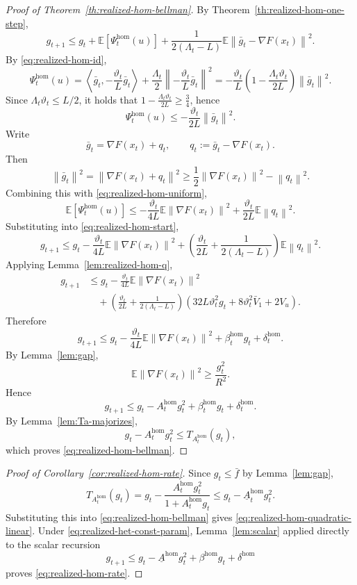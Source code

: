\documentclass{article}
\theoremstyle{definition}
\newcommand{\EE}{\mathbb E}
\newcommand{\norm}[1]{\left\lVert #1\right\rVert}
\newcommand{\ip}[2]{\left\langle #1,#2\right\rangle}
\begin{document}
\begin{proof}[Proof of Theorem~\ref{th:realized-hom-bellman}]
By Theorem~\ref{th:realized-hom-one-step},
\begin{equation}
g_{t+1}
\le
g_t+\EE[\Psi_t^{\mathrm{hom}}(u)]
+
\frac{1}{2(\Lambda_t-L)}\EE\norm{\bar g_t-\nabla F(x_t)}^2.
\label{eq:realized-hom-start}\end{equation}
By \eqref{eq:realized-hom-id},
\[
\Psi_t^{\mathrm{hom}}(u)
=
\ip{\bar g_t}{-\frac{\vartheta_t}{L}\bar g_t}
+
\frac{\Lambda_t}{2}
\left\|-\frac{\vartheta_t}{L}\bar g_t\right\|^2
=
-\frac{\vartheta_t}{L}
\left(
1-\frac{\Lambda_t\vartheta_t}{2L}
\right)\norm{\bar g_t}^2.
\]
Since $\Lambda_t\vartheta_t\le L/2$, it holds that $1-\frac{\Lambda_t\vartheta_t}{2L}\ge \frac34$,
hence
\begin{equation}
\Psi_t^{\mathrm{hom}}(u)\le -\frac{\vartheta_t}{2L}\norm{\bar g_t}^2.
\label{eq:realized-hom-uniform}\end{equation}
Write
\[
\bar g_t=\nabla F(x_t)+q_t,
\qquad
q_t:=\bar g_t-\nabla F(x_t).
\]
Then
\[
\norm{\bar g_t}^2
=
\norm{\nabla F(x_t)+q_t}^2
\ge
\frac12\norm{\nabla F(x_t)}^2-\norm{q_t}^2.
\]
Combining this with \eqref{eq:realized-hom-uniform},
\[
\EE[\Psi_t^{\mathrm{hom}}(u)]
\le
-\frac{\vartheta_t}{4L}\EE\norm{\nabla F(x_t)}^2
+
\frac{\vartheta_t}{2L}\EE\norm{q_t}^2.
\]
Substituting into \eqref{eq:realized-hom-start},
\[
g_{t+1}
\le
g_t
-
\frac{\vartheta_t}{4L}\EE\norm{\nabla F(x_t)}^2
+
\left(
\frac{\vartheta_t}{2L}
+
\frac{1}{2(\Lambda_t-L)}
\right)\EE\norm{q_t}^2.
\]
Applying Lemma~\ref{lem:realized-hom-q},
\begin{align*}
g_{t+1}
&\le
g_t
-
\frac{\vartheta_t}{4L}\EE\norm{\nabla F(x_t)}^2\\
&\quad+
\left(
\frac{\vartheta_t}{2L}
+
\frac{1}{2(\Lambda_t-L)}
\right)
\left(
32L\vartheta_t^2 g_t
+
8\vartheta_t^2\bar V_1
+
2V_u
\right).
\end{align*}
Therefore
\[
g_{t+1}
\le
g_t
-
\frac{\vartheta_t}{4L}\EE\norm{\nabla F(x_t)}^2
+
\beta_t^{\mathrm{hom}}g_t
+
\delta_t^{\mathrm{hom}}.
\]
By Lemma~\ref{lem:gap},
\[
\EE\norm{\nabla F(x_t)}^2\ge \frac{g_t^2}{R^2}.
\]
Hence
\[
g_{t+1}
\le
g_t-A_t^{\mathrm{hom}}g_t^2+\beta_t^{\mathrm{hom}}g_t+\delta_t^{\mathrm{hom}}.
\]
By Lemma~\ref{lem:Ta-majorizes},
\[
g_t-A_t^{\mathrm{hom}}g_t^2\le T_{A_t^{\mathrm{hom}}}(g_t),
\]
which proves \eqref{eq:realized-hom-bellman}.
\end{proof}

\begin{proof}[Proof of Corollary~\ref{cor:realized-hom-rate}]
Since $g_t\le \bar f$ by Lemma~\ref{lem:gap},
\[
T_{A_t^{\mathrm{hom}}}(g_t)
=
g_t-\frac{A_t^{\mathrm{hom}}g_t^2}{1+A_t^{\mathrm{hom}}g_t}
\le
g_t-\underline A_t^{\mathrm{hom}}g_t^2.
\]
Substituting this into \eqref{eq:realized-hom-bellman} gives
\eqref{eq:realized-hom-quadratic-linear}. Under \eqref{eq:realized-het-const-param},
Lemma~\ref{lem:scalar} applied directly to the scalar recursion
\[
g_{t+1}\le g_t-\underline A^{\mathrm{hom}}g_t^2+\beta^{\mathrm{hom}}g_t+\delta^{\mathrm{hom}}
\]
proves \eqref{eq:realized-hom-rate}.
\end{proof}
\end{document}
